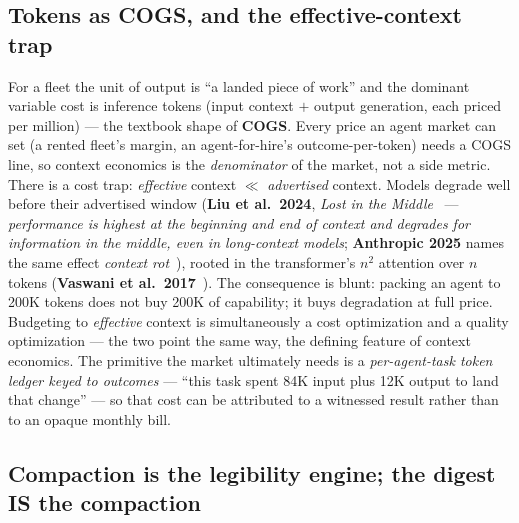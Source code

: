 \documentclass[11pt,a4paper]{article}
\theoremstyle{definition}
\theoremstyle{plain}
\begin{document}

\subsection{Tokens as COGS, and the effective-context trap}\label{sec:cogs}

For a fleet the unit of output is ``a landed piece of work'' and the dominant
variable cost is inference tokens (input context $+$ output generation, each priced
per million) --- the textbook shape of \textbf{COGS}. Every price an agent market can
set (a rented fleet's margin, an agent-for-hire's outcome-per-token) needs a COGS
line, so context economics is the \emph{denominator} of the market, not a side metric.
There is a cost trap: \emph{effective} context $\ll$ \emph{advertised} context. Models
degrade well before their advertised window (\textbf{Liu et al.\ 2024}, \emph{Lost in
the Middle}~ --- \emph{performance is highest at the beginning and end
of context and degrades for information in the middle, even in long-context models};
\textbf{Anthropic 2025} names the same effect \emph{context rot}~),
rooted in the transformer's $n^2$ attention over $n$ tokens (\textbf{Vaswani et al.\
2017}~). The consequence is blunt: packing an agent to 200K tokens
does not buy 200K of capability; it buys degradation at full price. Budgeting to
\emph{effective} context is simultaneously a cost optimization and a quality
optimization --- the two point the same way, the defining feature of context
economics. The primitive the market ultimately needs is a \emph{per-agent-task token
ledger keyed to outcomes} --- ``this task spent 84K input plus 12K output to land
that change'' --- so that cost can be attributed to a witnessed result rather than to
an opaque monthly bill.

\subsection{Compaction is the legibility engine; the digest IS the compaction}\label{sec:tokens-digest}
\end{document}
